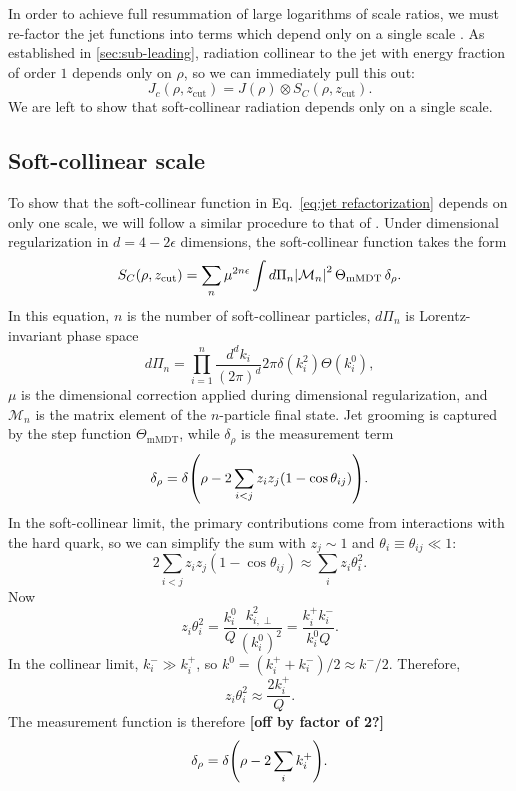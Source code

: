 \documentclass[11pt,twoside,reqno]{amsart}
\theoremstyle{plain}
\theoremstyle{remark}
\theoremstyle{definition}
\theoremstyle{remark}
\theoremstyle{definition}
\theoremstyle{definition}
\newcommand{\cM}{\mathcal{M}}
\newcommand{\zcut}{z_\mathrm{cut}}
\newcommand{\mMDT}{\mathrm{mMDT}}
\begin{document}
	In order to achieve full resummation of large logarithms of scale ratios, we must re-factor the jet functions into terms which depend only on a single scale \cite{frye_factorization_2016}. As established in \ref{sec:sub-leading}, radiation collinear to the jet with energy fraction of order $1$ depends only on $\rho$, so we can immediately pull this out:
	\begin{equation}\label{eq:jet refactorization}
		J_c(\rho, \zcut) = J(\rho) \otimes S_C(\rho, \zcut).
	\end{equation}
	We are left to show that soft-collinear radiation depends only on a single scale.

\subsection{Soft-collinear scale}
	
	To show that the soft-collinear function in Eq.\ \ref{eq:jet refactorization} depends on only one scale, we will follow a similar procedure to that of \cite{frye_factorization_2016}. Under dimensional regularization in $d = 4 - 2\epsilon$ dimensions, the soft-collinear function takes the form
	\begin{equation}
		S_C(\rho, \zcut) = \sum_n \mu^{2n\epsilon} \int d\Pi_n \abs{\cM_n}^2 \,\Theta_{\mMDT}\, \delta_\rho.
	\end{equation}
	In this equation, $n$ is the number of soft-collinear particles, $d\Pi_n$ is Lorentz-invariant phase space
	\begin{equation}
		d\Pi_n = \prod_{i = 1}^n \frac{d^d k_i}{(2\pi)^d} 2\pi \delta(k_i^2)\Theta(k_i^0),
	\end{equation}
	$\mu$ is the dimensional correction applied during dimensional regularization, and $\cM_n$ is the matrix element of the $n$-particle final state. Jet grooming is captured by the step function $\Theta_\mMDT$, while $\delta_\rho$ is the measurement term
	\begin{equation}
		\delta_\rho = \delta\qty(\rho - 2\sum_{i<j} z_i z_j (1 - \cos\theta_{ij})).
	\end{equation}
	In the soft-collinear limit, the primary contributions come from interactions with the hard quark, so we can simplify the sum with $z_j \sim 1$ and $\theta_i \equiv \theta_{ij} \ll 1$:
	\begin{equation}
		2\sum_{i<j} z_i z_j (1 - \cos\theta_{ij}) \approx \sum_i z_i \theta_i^2.
	\end{equation}
	Now
	\begin{equation}
		z_i \theta_i^2 = \frac{k_i^0}{Q}\frac{k_{i,\perp}^2}{(k_i^0)^2} = \frac{k_i^+ k_i^-}{k_i^0 Q}.
	\end{equation}
	In the collinear limit, $k_i^- \gg k_i^+$, so $k^0 = (k_i^+ + k_i^-)/2 \approx k^-/2$. Therefore,
	\begin{equation}
		z_i \theta_i^2 \approx \frac{2 k_i^+}{Q}.
	\end{equation}
	The measurement function is therefore {\color{red}\textbf{[off by factor of 2?]}}
	\begin{equation}
		\delta_\rho = \delta\qty(\rho - 2\sum_i k_i^+).
	\end{equation}
\end{document}
